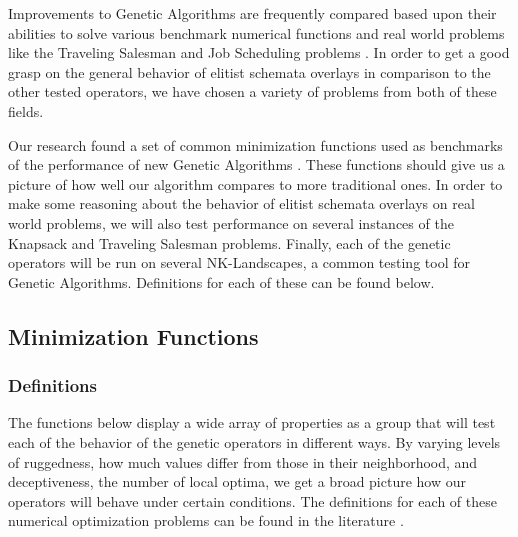 Improvements to Genetic Algorithms are frequently compared based upon their abilities to solve various benchmark numerical functions and real world problems like the Traveling Salesman and Job Scheduling problems \cite{molga05}. In order to get a good grasp on the general behavior of elitist schemata overlays in comparison to the other tested operators, we have chosen a variety of problems from both of these fields.

Our research found a set of common minimization functions used as benchmarks of the performance of new Genetic Algorithms \cite{Deb99,Eiben95,Tsutsui99}. These functions should give us a picture of how well our algorithm compares to more traditional ones. In order to make some reasoning about the behavior of elitist schemata overlays on real world problems, we will also test performance on several instances of the Knapsack and Traveling Salesman problems. Finally, each of the genetic operators will be run on several NK-Landscapes, a common testing tool for Genetic Algorithms. Definitions for each of these can be found below.

\subsection*{Minimization Functions}
\subsubsection*{Definitions}

The functions below display a wide array of properties as a group that will test each of the behavior of the genetic operators in different ways. By varying levels of ruggedness, how much values differ from those in their neighborhood, and deceptiveness, the number of local optima, we get a broad picture how our operators will behave under certain conditions. The definitions for each of these numerical optimization problems can be found in the literature \cite{molga05,yang10}.

